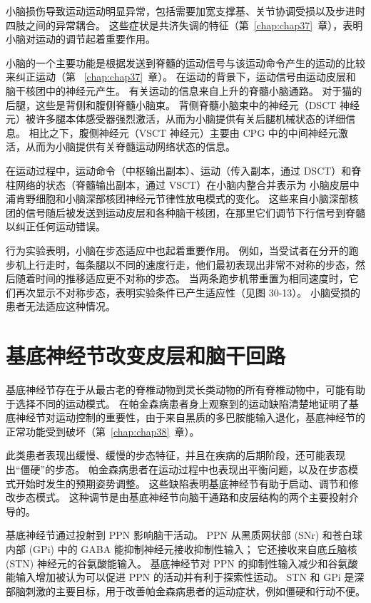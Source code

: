 小脑损伤导致运动运动明显异常，包括需要加宽支撑基、关节协调受损以及步进时四肢之间的异常耦合。
这些症状是共济失调的特征（第~\ref{chap:chap37}~章），表明小脑对运动的调节起着重要作用。


小脑的一个主要功能是根据发送到脊髓的运动信号与该运动命令产生的运动的比较来纠正运动（第 ~\ref{chap:chap37}~章）。
在运动的背景下，运动信号由运动皮层和脑干核团中的神经元产生。
有关运动的信息来自上升的脊髓小脑通路。
对于猫的后腿，这些是背侧和腹侧脊髓小脑束。
背侧脊髓小脑束中的神经元（DSCT 神经元）被许多腿本体感受器强烈激活，从而为小脑提供有关后腿机械状态的详细信息。
相比之下，腹侧神经元（VSCT 神经元）主要由 CPG 中的中间神经元激活，从而为小脑提供有关脊髓运动网络状态的信息。


在运动过程中，运动命令（中枢输出副本）、运动（传入副本，通过 DSCT）和脊柱网络的状态（脊髓输出副本，通过 VSCT）在小脑内整合并表示为 小脑皮层中浦肯野细胞和小脑深部核团神经元节律性放电模式的变化。
这些来自小脑深部核团的信号随后被发送到运动皮层和各种脑干核团，在那里它们调节下行信号到脊髓以纠正任何运动错误。


行为实验表明，小脑在步态适应中也起着重要作用。
例如，当受试者在分开的跑步机上行走时，每条腿以不同的速度行走，他们最初表现出非常不对称的步态，然后随着时间的推移适应更不对称的步态。
当两条跑步机带重置为相同速度时，它们再次显示不对称步态，表明实验条件已产生适应性（见图 30-13）。
小脑受损的患者无法适应这种情况。



\section{基底神经节改变皮层和脑干回路}

基底神经节存在于从最古老的脊椎动物到灵长类动物的所有脊椎动物中，可能有助于选择不同的运动模式。
在帕金森病患者身上观察到的运动缺陷清楚地证明了基底神经节对运动控制的重要性，由于来自黑质的多巴胺能输入退化，基底神经节的正常功能受到破坏（第~\ref{chap:chap38}~章）。


此类患者表现出缓慢、缓慢的步态特征，并且在疾病的后期阶段，还可能表现出“僵硬”的步态。
帕金森病患者在运动过程中也表现出平衡问题，以及在步态模式开始时发生的预期姿势调整。
这些缺陷表明基底神经节有助于启动、调节和修改步态模式。
这种调节是由基底神经节向脑干通路和皮层结构的两个主要投射介导的。


基底神经节通过投射到 PPN 影响脑干活动。
PPN 从黑质网状部 (SNr) 和苍白球内部 (GPi) 中的 GABA 能抑制神经元接收抑制性输入；
它还接收来自底丘脑核 (STN) 神经元的谷氨酸能输入。
基底神经节对 PPN 的抑制性输入减少和谷氨酸能输入增加被认为可以促进 PPN 的活动并有利于探索性运动。
STN 和 GPi 是深部脑刺激的主要目标，用于改善帕金森病患者的运动症状，例如僵硬和行动不便。


